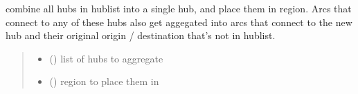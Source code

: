\documentclass[letterpaper,10pt,english]{sphinxmanual}
\begin{document}
\begin{fulllineitems}
\label{\detokenize{src.models.hydrogen.network.grid:src.models.hydrogen.network.grid.Grid}}
\pysigstartsignatures
\pysiglinewithargsret
{}
{}
{}
\pysigstopsignatures{}

\begin{fulllineitems}
\label{\detokenize{src.models.hydrogen.network.grid:src.models.hydrogen.network.grid.Grid.aggregate_hubs}}
\pysigstartsignatures
\pysiglinewithargsret
{}
{\sphinxparamcomma {}}
{}
\pysigstopsignatures
\sphinxAtStartPar
combine all hubs in hublist into a single hub, and place them in region. Arcs that
connect to any of these hubs also get aggegated into arcs that connect to the new hub and
their original origin / destination that’s not in hublist.
\begin{quote}\begin{description}
\begin{itemize}
\item {} 
\sphinxAtStartPar
{} () \textendash{} list of hubs to aggregate

\item {} 
\sphinxAtStartPar
{} ({\hyperref[\detokenize{src.models.hydrogen.network.region:src.models.hydrogen.network.region.Region}]{}}) \textendash{} region to place them in

\end{itemize}

\end{description}\end{quote}


\end{fulllineitems}
\end{fulllineitems}
\end{document}

